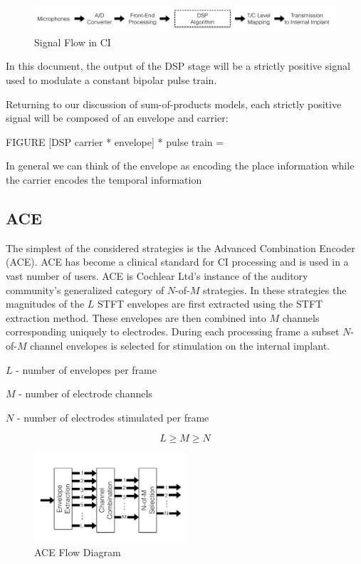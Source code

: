 \documentclass [11pt, proquest] {uwthesis}[2015/03/03]
\begin{document}
\begin{figure}[!ht]
  \centering
    \includegraphics[width=1.0\textwidth]{CI_Signal_FlowTEMP}   
    \caption{Signal Flow in CI}
\end{figure}

In this document, the output of the DSP stage will be a strictly positive signal used to modulate a constant bipolar pulse train.

Returning to our discussion of sum-of-products models, each strictly positive signal will be composed of an envelope and carrier:

FIGURE
[DSP carrier * envelope] * pulse train = ~~~

In general we can think of the envelope as encoding the place information while the carrier encodes the temporal information

\subsection{ACE}

The simplest of the considered strategies is the Advanced Combination Encoder (ACE).  ACE has become a clinical standard for CI processing and is used in a vast number of users.  ACE is Cochlear Ltd's instance of the auditory community's generalized category of $N$-of-$M$ strategies.  In these strategies the magnitudes of the $L$ STFT envelopes are first extracted using the STFT extraction method.  These envelopes are then combined into $M$ channels corresponding uniquely to electrodes.  During each processing frame a subset $N$-of-$M$ channel envelopes is selected for stimulation on the internal implant.

$L$ - number of envelopes per frame

$M$ - number of electrode channels

$N$ - number of electrodes stimulated per frame

$$L \geq M \geq N$$

\begin{figure}[!ht]
  \centering
    \includegraphics[width=0.5\textwidth]{ACE_flow_diagram_explicitTEMP}   
    \caption{ACE Flow Diagram}
\end{figure}
\end{document}
